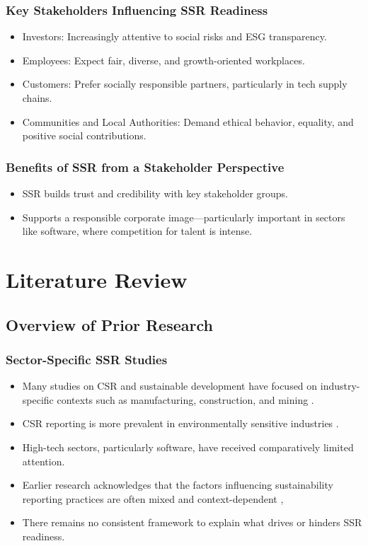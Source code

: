 \subsubsection{Key Stakeholders Influencing SSR Readiness}
\begin{itemize}
    \item Investors: Increasingly attentive to social risks and ESG transparency.
    \item Employees: Expect fair, diverse, and growth-oriented workplaces.
    \item Customers: Prefer socially responsible partners, particularly in tech supply chains.
    \item Communities and Local Authorities: Demand ethical behavior, equality, and positive social contributions.
\end{itemize}

\subsubsection{Benefits of SSR from a Stakeholder Perspective}
\begin{itemize}
    \item SSR builds trust and credibility with key stakeholder groups.
    \item Supports a responsible corporate image—particularly important in sectors like software, where competition for talent is intense.
\end{itemize}

\section{Literature Review}

\subsection{Overview of Prior Research}
\subsubsection{Sector-Specific SSR Studies}
\begin{itemize}
    \item Many studies on CSR and sustainable development have focused on industry-specific contexts such as manufacturing, construction, 
    and mining \parencite{Ye2020, Afshari2022}. 
    \item CSR reporting is more prevalent in environmentally sensitive industries \parencite{Lock2016}. 
    \item High-tech sectors, particularly software, have received comparatively limited attention. 
    \item Earlier research acknowledges that the factors influencing sustainability reporting practices are often mixed and 
    context-dependent \parencite{Fifka2013}, 
    \item There remains no consistent framework to explain what drives or hinders SSR readiness.
\end{itemize}

